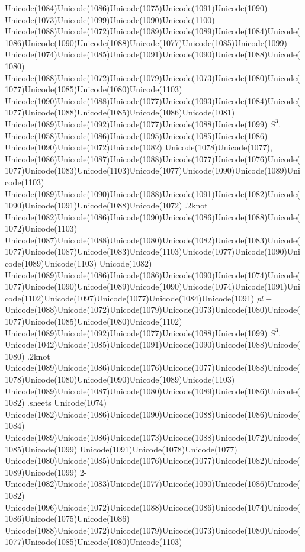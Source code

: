 \documentclass[a4paper,11pt]{report}
\begin{document}
{{Unicode(1084)Unicode(1086)Unicode(1075)Unicode(1091)Unicode(1090)
Unicode(1073)Unicode(1099)Unicode(1090)Unicode(1100)
Unicode(1088)Unicode(1072)Unicode(1089)Unicode(1089)Unicode(1084)Unicode(1086)Unicode(1090)Unicode(1088)Unicode(1077)Unicode(1085)Unicode(1099)
Unicode(1074)Unicode(1085)Unicode(1091)Unicode(1090)Unicode(1088)Unicode(1080)
Unicode(1088)Unicode(1072)Unicode(1079)Unicode(1073)Unicode(1080)Unicode(1077)Unicode(1085)Unicode(1080)Unicode(1103)
Unicode(1090)Unicode(1088)Unicode(1077)Unicode(1093)Unicode(1084)Unicode(1077)Unicode(1088)Unicode(1085)Unicode(1086)Unicode(1081)
Unicode(1089)Unicode(1092)Unicode(1077)Unicode(1088)Unicode(1099) $S^3.$ Unicode(1058)Unicode(1086)Unicode(1095)Unicode(1085)Unicode(1086)
Unicode(1090)Unicode(1072)Unicode(1082) Unicode(1078)Unicode(1077),
Unicode(1086)Unicode(1087)Unicode(1088)Unicode(1077)Unicode(1076)Unicode(1077)Unicode(1083)Unicode(1103)Unicode(1077)Unicode(1090)Unicode(1089)Unicode(1103)
Unicode(1089)Unicode(1090)Unicode(1088)Unicode(1091)Unicode(1082)Unicode(1090)Unicode(1091)Unicode(1088)Unicode(1072)
.2knot
Unicode(1082)Unicode(1086)Unicode(1090)Unicode(1086)Unicode(1088)Unicode(1072)Unicode(1103)
Unicode(1087)Unicode(1088)Unicode(1080)Unicode(1082)Unicode(1083)Unicode(1077)Unicode(1087)Unicode(1083)Unicode(1103)Unicode(1077)Unicode(1090)Unicode(1089)Unicode(1103)
Unicode(1082)
Unicode(1089)Unicode(1086)Unicode(1086)Unicode(1090)Unicode(1074)Unicode(1077)Unicode(1090)Unicode(1089)Unicode(1090)Unicode(1074)Unicode(1091)Unicode(1102)Unicode(1097)Unicode(1077)Unicode(1084)Unicode(1091) $pl-$Unicode(1088)Unicode(1072)Unicode(1079)Unicode(1073)Unicode(1080)Unicode(1077)Unicode(1085)Unicode(1080)Unicode(1102)
Unicode(1089)Unicode(1092)Unicode(1077)Unicode(1088)Unicode(1099) $S^3.$ Unicode(1042)Unicode(1085)Unicode(1091)Unicode(1090)Unicode(1088)Unicode(1080)
.2knot
Unicode(1089)Unicode(1086)Unicode(1076)Unicode(1077)Unicode(1088)Unicode(1078)Unicode(1080)Unicode(1090)Unicode(1089)Unicode(1103)
Unicode(1089)Unicode(1087)Unicode(1080)Unicode(1089)Unicode(1086)Unicode(1082)
.sheets Unicode(1074)
Unicode(1082)Unicode(1086)Unicode(1090)Unicode(1088)Unicode(1086)Unicode(1084)
Unicode(1089)Unicode(1086)Unicode(1073)Unicode(1088)Unicode(1072)Unicode(1085)Unicode(1099)
Unicode(1091)Unicode(1078)Unicode(1077)
Unicode(1080)Unicode(1085)Unicode(1076)Unicode(1077)Unicode(1082)Unicode(1089)Unicode(1099)
2-Unicode(1082)Unicode(1083)Unicode(1077)Unicode(1090)Unicode(1086)Unicode(1082)
Unicode(1096)Unicode(1072)Unicode(1088)Unicode(1086)Unicode(1074)Unicode(1086)Unicode(1075)Unicode(1086)
Unicode(1088)Unicode(1072)Unicode(1079)Unicode(1073)Unicode(1080)Unicode(1077)Unicode(1085)Unicode(1080)Unicode(1103)
}}
\end{document}
